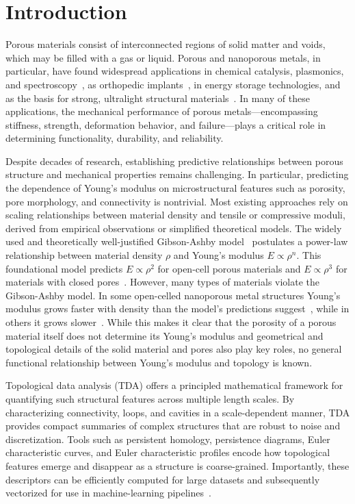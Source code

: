 \documentclass[sn-mathphys,Numbered]{sn-jnl}
\theoremstyle{definition}
\begin{document}
\section{Introduction}
Porous materials consist of interconnected regions of solid matter and voids, which may be filled with a gas or liquid.  Porous and nanoporous metals, in particular, have found widespread applications in chemical catalysis, plasmonics, and spectroscopy~\cite{Koya2021}, as orthopedic implants~\cite{Guo2025,Matassi2013,Depboylu2024}, in energy storage technologies, and as the basis for strong, ultralight structural materials~\cite{Schaedler2016}. In many of these applications, the mechanical performance of porous metals—encompassing stiffness, strength, deformation behavior, and failure—plays a critical role in determining functionality, durability, and reliability.


Despite decades of research, establishing predictive relationships between porous structure and mechanical properties remains challenging. In particular, predicting the dependence of Young’s modulus on microstructural features such as porosity, pore morphology, and connectivity is nontrivial. Most existing approaches rely on scaling relationships between material density and tensile or compressive moduli, derived from empirical observations or simplified theoretical models.
The widely used and theoretically well-justified Gibson-Ashby model~\cite{Gibson1982} postulates a power-law relationship between material density $\rho$ and Young's modulus $E \propto \rho^n$. This foundational model predicts $E \propto \rho^2$ for open-cell porous materials and $E \propto \rho^3 $ for materials with closed pores~\cite{Gibson1982}. 
However, many types of materials violate the Gibson-Ashby model. In some open-celled nanoporous metal structures Young's modulus grows faster with density than the model's predictions suggest~\cite{Badwe2017}, while in others it grows slower~\cite{Zheng2014}. While this makes it clear that the porosity of a porous material itself does not determine its Young's modulus and geometrical and topological details of the solid material and pores also play key roles, no general functional relationship between Young's modulus and topology is known. 

Topological data analysis (TDA) offers a principled mathematical framework for quantifying such structural features across multiple length scales. By characterizing connectivity, loops, and cavities in a scale-dependent manner, TDA provides compact summaries of complex structures that are robust to noise and discretization. Tools such as persistent homology, persistence diagrams, Euler characteristic curves, and Euler characteristic profiles encode how topological features emerge and disappear as a structure is coarse-grained. Importantly, these descriptors can be efficiently computed for large datasets and subsequently vectorized for use in machine-learning pipelines~\cite{Krishnapriyan2021,Moon2019}.
\end{document}
